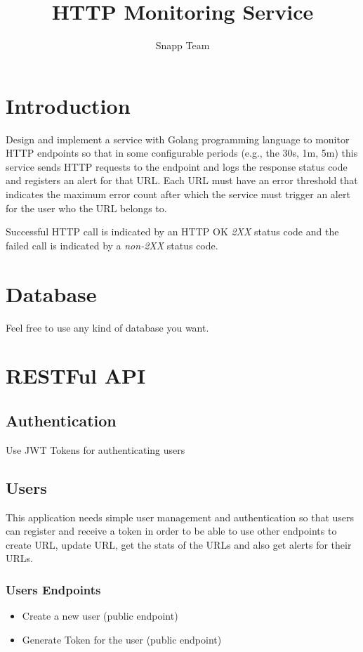 \documentclass{article}
\begin{document}
\title{HTTP Monitoring Service}
\author{Snapp Team}

\maketitle
\tableofcontents

\section{Introduction}
Design and implement a service with Golang programming language to monitor HTTP endpoints so that in some configurable periods (e.g., the 30s, 1m, 5m)
this service sends HTTP requests to the endpoint and logs the response status code and registers an alert for that URL.
Each URL must have an error threshold that indicates the maximum error count after which the service must trigger an alert for the user who the URL belongs to.

Successful HTTP call is indicated by an HTTP OK \textit{2XX} status code and the failed call is indicated by a \textit{non-2XX} status code.

\section{Database}

Feel free to use any kind of database you want.

\section{RESTFul API}
\subsection{Authentication}
Use JWT Tokens for authenticating users

\subsection{Users}
This application needs simple user management and authentication so that users can register and receive a token in order to be able to use other endpoints to create URL, update URL, get the stats of the URLs and also get alerts for their URLs.

\subsubsection{Users Endpoints}
\begin{itemize}
  \item Create a new user (public endpoint)
  \item Generate Token for the user (public endpoint)
\end{itemize}
\end{document}
